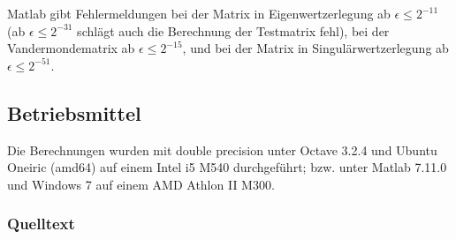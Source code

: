 \documentclass{scrartcl}
\begin{document}
Matlab gibt Fehlermeldungen bei der Matrix in Eigenwertzerlegung ab \(\epsilon
\leq 2^{-11}\) (ab \(\epsilon \leq 2^{-31}\) schlägt auch die Berechnung der
Testmatrix fehl), bei der Vandermondematrix ab \(\epsilon \leq 2^{-15}\), und
bei der Matrix in Singulärwertzerlegung ab \(\epsilon \leq 2^{-51}\).

\subsection{Betriebsmittel}

Die Berechnungen wurden mit double precision unter Octave 3.2.4 und Ubuntu
Oneiric (amd64) auf einem Intel i5 M540 durchgeführt; bzw. unter Matlab 7.11.0
und Windows 7 auf einem AMD Athlon II M300.

\subsubsection{Quelltext}













\end{document}
